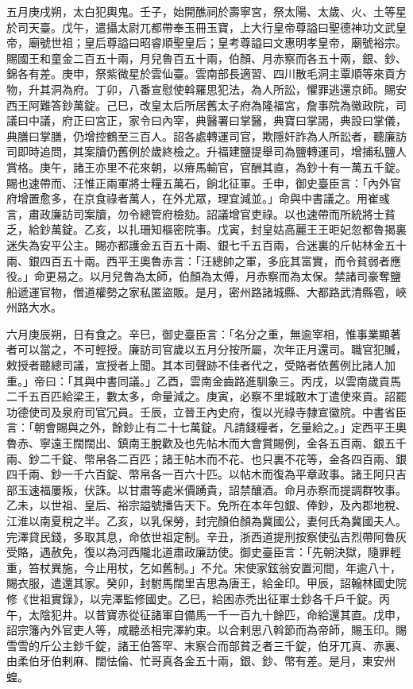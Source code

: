 \begin{pinyinscope}
 五月庚戌朔，太白犯輿鬼。壬子，始開醮祠於壽寧宮，祭太陽、太歲、火、土等星於司天臺。戊午，遣攝太尉兀都帶奉玉冊玉寶，上大行皇帝尊謚曰聖德神功文武皇帝，廟號世祖；皇后尊謚曰昭睿順聖皇后；皇考尊謚曰文惠明孝皇帝，廟號裕宗。賜國王和童金二百五十兩，月兒魯百五十兩，伯顏、月赤察而各五十兩，銀、鈔、錦各有差。庚申，祭紫微星於雲仙臺。雲南部長適習、四川散毛洞主覃順等來貢方物，升其洞為府。丁卯，八番宣慰使斡羅思犯法，為人所訟，懼罪逃還京師。賜安西王阿難答鈔萬錠。己巳，改皇太后所居舊太子府為隆福宮，詹事院為徽政院，司議曰中議，府正曰宮正，家令曰內宰，典醫署曰掌醫，典寶曰掌謁，典設曰掌儀，典膳曰掌膳，仍增控鶴至三百人。詔各處轉運司官，欺隱奸詐為人所訟者，聽廉訪司即時追問，其案牘仍舊例於歲終檢之。升福建鹽提舉司為鹽轉運司，增捕私鹽人賞格。庚午，諸王亦里不花來朝，以瘠馬輸官，官酬其直，為鈔十有一萬五千錠。賜也速帶而、汪惟正兩軍將士糧五萬石，餉北征軍。壬申，御史臺臣言：「內外官府增置愈多，在京食祿者萬人，在外尤眾，理宜減並。」命與中書議之。用崔彧言，肅政廉訪司案牘，勿令總管府檢劾。詔議增官吏祿。以也速帶而所統將士貧乏，給鈔萬錠。乙亥，以扎珊知樞密院事。戊寅，封皇姑高麗王王昛妃忽都魯揭裏迷失為安平公主。賜亦都護金五百五十兩、銀七千五百兩，合迷裏的斤帖林金五十兩、銀四百五十兩。西平王奧魯赤言：「汪總帥之軍，多庇其富實，而令貧弱者應役。」命更易之。以月兒魯為太師，伯顏為太傅，月赤察而為太保。禁諸司豪奪鹽船遞運官物，僧道權勢之家私匿盜販。是月，密州路諸城縣、大都路武清縣雹，峽州路大水。



 六月庚辰朔，日有食之。辛巳，御史臺臣言：「名分之重，無逾宰相，惟事業顯著者可以當之，不可輕授。廉訪司官歲以五月分按所屬，次年正月還司。職官犯贓，敕授者聽總司議，宣授者上聞。其本司聲跡不佳者代之，受賂者依舊例比諸人加重。」帝曰：「其與中書同議。」乙酉，雲南金齒路進馴象三。丙戌，以雲南歲貢馬二千五百匹給梁王，數太多，命量減之。庚寅，必察不里城敢木丁遣使來貢。詔罷功德使司及泉府司官冗員。壬辰，立晉王內史府，復以光祿寺隸宣徽院。中書省臣言：「朝會賜與之外，餘鈔止有二十七萬錠。凡請錢糧者，乞量給之。」定西平王奧魯赤、寧遠王闊闊出、鎮南王脫歡及也先帖木而大會賞賜例，金各五百兩、銀五千兩、鈔二千錠、幣帛各二百匹；諸王帖木而不花、也只裏不花等，金各四百兩、銀四千兩、鈔一千六百錠、幣帛各一百六十匹。以帖木而復為平章政事。諸王阿只吉部玉速福屢叛，伏誅。以甘肅等處米價踴貴，詔禁釀酒。命月赤察而提調群牧事。乙未，以世祖、皇后、裕宗謚號播告天下。免所在本年包銀、俸鈔，及內郡地稅、江淮以南夏稅之半。乙亥，以乳保勞，封完顏伯顏為冀國公，妻何氏為冀國夫人。完澤貸民錢，多取其息，命依世祖定制。辛丑，浙西道提刑按察使弘吉烈帶阿魯灰受賂，遇赦免，復以為河西隴北道肅政廉訪使。御史臺臣言：「先朝決獄，隨罪輕重，笞杖異施，今止用杖，乞如舊制。」不允。宋使家鉉翁安置河間，年逾八十，賜衣服，遣還其家。癸卯，封駙馬闊里吉思為唐王，給金印。甲辰，詔翰林國史院修《世祖實錄》，以完澤監修國史。乙巳，給困赤禿出征軍士鈔各千戶千錠。丙午，太陰犯井。以昔寶赤從征諸軍自備馬一千一百九十餘匹，命給還其直。戊申，詔宗籓內外官吏人等，咸聽丞相完澤約束。以合剌思八斡節而為帝師，賜玉印。賜雪雪的斤公主鈔千錠，諸王伯答罕、末察合而部貧乏者三千錠，伯牙兀真、赤裏、由柔伯牙伯剌麻、闊怯倫、忙哥真各金五十兩，銀、鈔、幣有差。是月，東安州蝗。




\end{pinyinscope}
